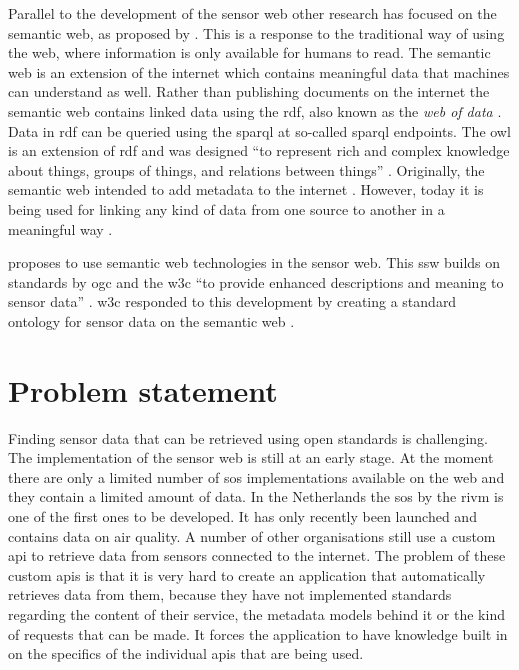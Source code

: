 Parallel to the development of the sensor web other research has focused on the semantic web, as proposed by \cite{LD:Berners-lee}. This is a response to the traditional way of using the web, where information is only available for humans to read. The semantic web is an extension of the internet which contains meaningful data that machines can understand as well. Rather than publishing documents on the internet the semantic web contains linked data using the \ac{rdf}, also known as the \textit{web of data} \citep{LD:Bizer}. Data in \ac{rdf} can be queried using the \ac{sparql} at so-called \ac{sparql} endpoints. The \ac{owl} is an extension of \ac{rdf} and was designed \enquote{to represent rich and complex knowledge about things, groups of things, and relations between things} \citep{LD:OWL}. Originally, the semantic web intended to add metadata to the internet \citep{LD:W3C}. However, today it is being used for linking any kind of data from one source to another in a meaningful way \citep{LD:Cambridge}. 

\cite{SSW:Sheth} proposes to use semantic web technologies in the sensor web. This \ac{ssw} builds on standards by \ac{ogc} and the \ac{w3c} \enquote{to provide enhanced descriptions and meaning to sensor data} \cite[p. 78]{SSW:Sheth}. \ac{w3c} responded to this development by creating a standard ontology for sensor data on the semantic web \citep{SSW:SSN_incubatorGroup}. 

\section{Problem statement}
Finding sensor data that can be retrieved using open standards is challenging. The implementation of the sensor web is still at an early stage. At the moment there are only a limited number of \ac{sos} implementations available on the web and they contain a limited amount of data. In the Netherlands the \ac{sos} by the \ac{rivm} is one of the first ones to be developed. It has only recently been launched and contains data on air quality. A number of other organisations still use a custom \ac{api} to retrieve data from sensors connected to the internet. The problem of these custom \ac{api}s is that it is very hard to create an application that automatically retrieves data from them, because they have not implemented standards regarding the content of their service, the metadata models behind it or the kind of requests that can be made. It forces the application to have knowledge built in on the specifics of the individual \ac{api}s that are being used.  

